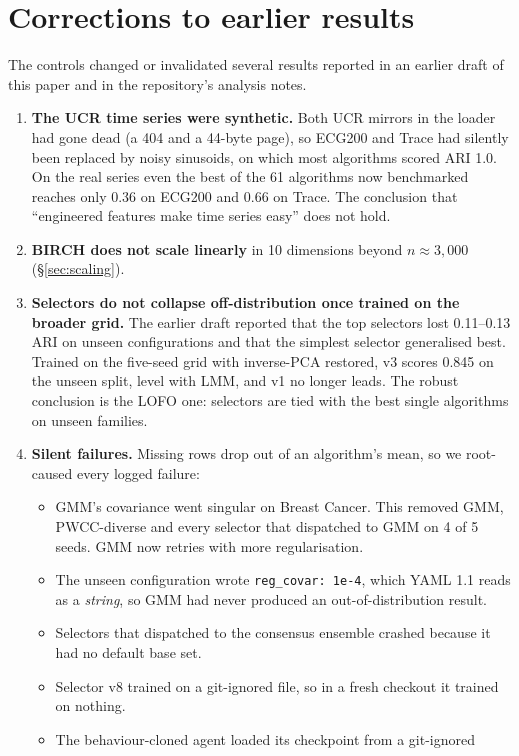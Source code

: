 \documentclass[11pt,a4paper]{article}
\newcommand{\code}[1]{\texttt{#1}}
\begin{document}
\section{Corrections to earlier results}\label{sec:corrections}
The controls changed or invalidated several results reported in an earlier
draft of this paper and in the repository's analysis notes.
\begin{enumerate}
  \item \textbf{The UCR time series were synthetic.} Both UCR mirrors in the
  loader had gone dead (a 404 and a 44-byte page), so ECG200 and Trace had
  silently been replaced by noisy sinusoids, on which most algorithms scored
  ARI 1.0. On the real series even the best of the 61 algorithms now
  benchmarked reaches only 0.36 on ECG200 and 0.66 on Trace. The conclusion that ``engineered features make time series
  easy'' does not hold.
  \item \textbf{BIRCH does not scale linearly} in 10 dimensions beyond
  $n \approx 3{,}000$ (\S\ref{sec:scaling}).
  \item \textbf{Selectors do not collapse off-distribution once trained on
  the broader grid.} The earlier draft reported that the top selectors lost
  0.11--0.13 ARI on unseen configurations and that the simplest selector
  generalised best. Trained on the five-seed grid with inverse-PCA restored,
  v3 scores 0.845 on the unseen split, level with LMM, and v1 no longer
  leads.
  The robust conclusion is the LOFO one: selectors are tied with the best
  single algorithms on unseen families.
  \item \textbf{Silent failures.} Missing rows drop out of an algorithm's mean,
  so we root-caused every logged failure:
  \begin{itemize}
    \item GMM's covariance went singular on Breast Cancer. This removed GMM,
    PWCC-diverse and every selector that dispatched to GMM on 4 of 5 seeds.
    GMM now retries with more regularisation.
    \item The unseen configuration wrote \code{reg\_covar: 1e-4}, which YAML 1.1
    reads as a \emph{string}, so GMM had never produced an out-of-distribution
    result.
    \item Selectors that dispatched to the consensus ensemble crashed because it
    had no default base set.
    \item Selector v8 trained on a git-ignored file, so in a fresh checkout it
    trained on nothing.
    \item The behaviour-cloned agent loaded its checkpoint from a git-ignored

\end{itemize}
\end{enumerate}
\end{document}
